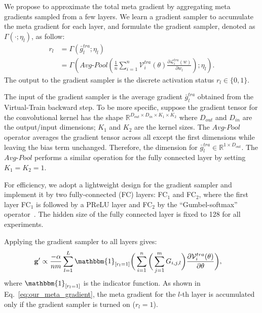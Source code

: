 \documentclass[final]{cvpr}
\begin{document}
We propose to approximate the total meta gradient by aggregating meta gradients sampled from a few layers. We learn a gradient sampler to accumulate the meta gradient for each layer, and formulate the gradient sampler, denoted as $\Gamma(\cdot; \eta_l)$, as follow:
\begin{equation}
\begin{split}
    \label{eq:rl} r_l &= \Gamma(\bar{g}_l^{tra}; \eta_l) \\
    &=\Gamma(\textit{Avg-Pool}(\frac{1}{n}\sum_{i=1}^{n}\mathcal{V}_i^{tra}(\theta)\frac{\partial \mathcal{L}_i^{tra}(w)}{\partial w_l}); \eta_l).
\end{split}
\end{equation}
The output to the gradient sampler is the discrete activation status $r_l \in \{0, 1\}$.

The input of the gradient sampler is the average gradient $\bar{g}_l^{tra}$ obtained from the Virtual-Train backward step.
To be more specific, suppose the gradient tensor for the convolutional kernel has the shape $\mathbb{R}^{D_{out}\times D_{in} \times K_1 \times K_2}$ where $D_{out}$ and $D_{in}$ are the output/input dimensions; $K_1$ and $K_2$ are the kernel sizes. The $\textit{Avg-Pool}$ operator averages the gradient tensor across all except the first dimensions while leaving the bias term unchanged. Therefore, the dimension for $\bar{g}_l^{tra} \in \mathbb{R}^{1\times D_{out}}$.
The $\textit{Avg-Pool}$ performs a similar operation for the fully connected layer by setting $K_1=K_2=1$.

For efficiency, we adopt a lightweight design for the gradient sampler and implement it by two fully-connected (FC) layers: FC$_1$ and FC$_2$, where the first layer FC$_1$ is followed by a PReLU layer and FC$_2$ by the ``Gumbel-softmax'' operator~\cite{jang2016categorical}. The hidden size of the fully connected layer is fixed to 128 for all experiments.


Applying the gradient sampler to all layers gives:
{\small
\begin{align}\label{eq:our_meta_gradient}
    &\mathbf{g}' \propto \frac{-\alpha}{nm}\sum_{l=1}^{L} \mathbbm{1}_{[r_l=1]}
                      \bigg(\sum_{i=1}^{n}\bigg(\sum_{j=1}^{m}G_{i,j,l}\bigg)
                      \frac{\partial \mathcal{V}_i^{tra}(\theta)}{\partial \theta}\bigg), 
\end{align}
}where $\mathbbm{1}_{[r_l=1]}$ is the indicator function.
As shown in Eq.~\eqref{eq:our_meta_gradient}, the meta gradient for the $l$-th layer is accumulated only if the gradient sampler is turned on (\ie $r_l=1$).
\end{document}
